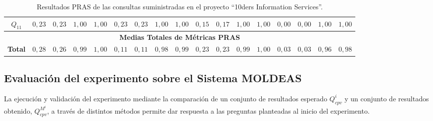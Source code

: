 \begin{sidewaystable}[!htb]
\begin{center}
\begin{tabular}{|c||c|c|c|c||c|c|c|c||c|c|c|c||c|c|c|c|}
$Q_{11}$  &$0,23$ & $0,23$ & $1,00$ & $1,00$ & 		$0,23$ & $0,23$ & $1,00$ & $1,00$ & 	$0,15$ & $0,17$ & $1,00$ & $1,00$ & 	$0,00$ & $0,00$ & $1,00$ & $1,00$ \\ \hline
\multicolumn{17}{|c|}{\textbf{Medias Totales de Métricas PRAS}} \\ \hline
\textbf{Total}  &$0,28$ & $0,26$ & $0,99$ & $1,00$ & 	$0,11$ & $0,11$ & $0,98$ & $0,99$ & 	$0,23$ & $0,23$ & $0,99$ & $1,00$ & 	$0,03$ & $0,03$ & $0,96$ & $0,98$ \\ \hline
\hline
 \end{tabular}
\caption{Resultados PRAS de las consultas suministradas en el proyecto ``10ders Information Services''.}\label{table:queries-ir-results}
  \label{tabla:results-dss}
  \end{center}
\end{sidewaystable} 


\subsection{Evaluación del experimento sobre el Sistema MOLDEAS}
La ejecución y validación del experimento mediante la comparación de un conjunto de resultados 
esperado $Q^{i}_{cpv}$ y un conjunto de resultados obtenido, $Q^{M^i}_{cpv}$, a través de distintos métodos 
permite dar respuesta a las preguntas planteadas al inicio del experimento.

